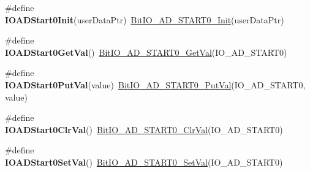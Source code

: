 \begin{DoxyCompactItemize}
\item 
\hypertarget{group___func_ala_ga7b64e2327074570935b88234b95d31d0}{\#define {\bfseries I\-O\-A\-D\-Start0\-Init}(user\-Data\-Ptr)~\hyperlink{group___bit_i_o___a_d___s_t_a_r_t0__module_ga17f8eaaf957ef280eef9742e14362f25}{Bit\-I\-O\-\_\-\-A\-D\-\_\-\-S\-T\-A\-R\-T0\-\_\-\-Init}(user\-Data\-Ptr)}\label{group___func_ala_ga7b64e2327074570935b88234b95d31d0}

\item 
\hypertarget{group___func_ala_ga1d6efa7e74735199cd284be9e1833c2f}{\#define {\bfseries I\-O\-A\-D\-Start0\-Get\-Val}()~\hyperlink{group___bit_i_o___a_d___s_t_a_r_t0__module_ga94c582ba5e44181fc6b6b407fb6bccbb}{Bit\-I\-O\-\_\-\-A\-D\-\_\-\-S\-T\-A\-R\-T0\-\_\-\-Get\-Val}(I\-O\-\_\-\-A\-D\-\_\-\-S\-T\-A\-R\-T0)}\label{group___func_ala_ga1d6efa7e74735199cd284be9e1833c2f}

\item 
\hypertarget{group___func_ala_ga397e3d2ada71d5c2dfb184d2ae6358ea}{\#define {\bfseries I\-O\-A\-D\-Start0\-Put\-Val}(value)~\hyperlink{group___bit_i_o___a_d___s_t_a_r_t0__module_gae8867e9c498da9f6504cac19f66955ee}{Bit\-I\-O\-\_\-\-A\-D\-\_\-\-S\-T\-A\-R\-T0\-\_\-\-Put\-Val}(I\-O\-\_\-\-A\-D\-\_\-\-S\-T\-A\-R\-T0, value)}\label{group___func_ala_ga397e3d2ada71d5c2dfb184d2ae6358ea}

\item 
\hypertarget{group___func_ala_ga6956fd76fc29e2ea4441cedbf7744366}{\#define {\bfseries I\-O\-A\-D\-Start0\-Clr\-Val}()~\hyperlink{group___bit_i_o___a_d___s_t_a_r_t0__module_gabe1b30675814b4e233123d237cb770e7}{Bit\-I\-O\-\_\-\-A\-D\-\_\-\-S\-T\-A\-R\-T0\-\_\-\-Clr\-Val}(I\-O\-\_\-\-A\-D\-\_\-\-S\-T\-A\-R\-T0)}\label{group___func_ala_ga6956fd76fc29e2ea4441cedbf7744366}

\item 
\hypertarget{group___func_ala_ga3f989127b6ac992c2f4456b619acbff2}{\#define {\bfseries I\-O\-A\-D\-Start0\-Set\-Val}()~\hyperlink{group___bit_i_o___a_d___s_t_a_r_t0__module_gac207ab52de850e67991e06cd87754484}{Bit\-I\-O\-\_\-\-A\-D\-\_\-\-S\-T\-A\-R\-T0\-\_\-\-Set\-Val}(I\-O\-\_\-\-A\-D\-\_\-\-S\-T\-A\-R\-T0)}\label{group___func_ala_ga3f989127b6ac992c2f4456b619acbff2}

\end{DoxyCompactItemize}
